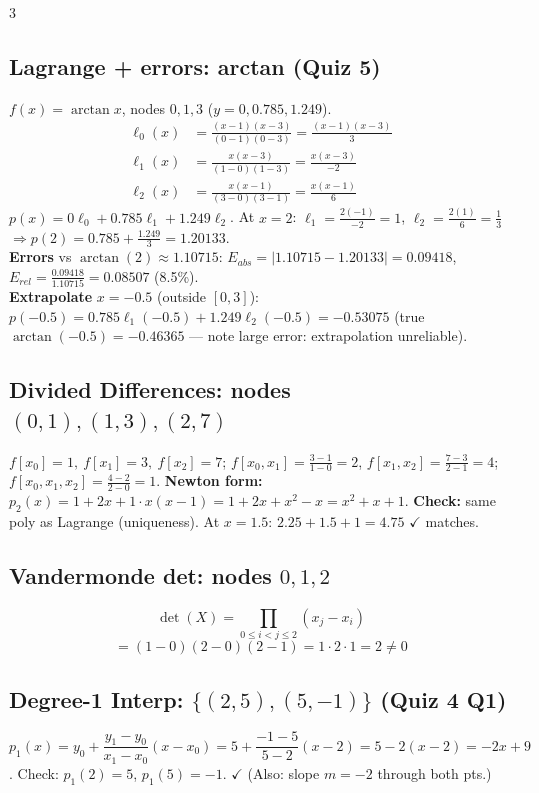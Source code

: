 \documentclass[9pt]{extarticle}
\newcommand{\hl}[1]{\textbf{\textcolor{BrickRed}{#1}}}
\begin{document}
\begin{multicols}{3}
\subsection{Lagrange + errors: arctan (Quiz 5)}
$f(x)=\arctan x$, nodes $0,1,3$ ($y=0,0.785,1.249$).
\begin{align*}
\ell_0(x)&=\tfrac{(x-1)(x-3)}{(0-1)(0-3)}=\tfrac{(x-1)(x-3)}{3}\\
\ell_1(x)&=\tfrac{x(x-3)}{(1-0)(1-3)}=\tfrac{x(x-3)}{-2}\\
\ell_2(x)&=\tfrac{x(x-1)}{(3-0)(3-1)}=\tfrac{x(x-1)}{6}
\end{align*}
$p(x)=0\ell_0+0.785\ell_1+1.249\ell_2$. At $x=2$: $\ell_1=\tfrac{2(-1)}{-2}=1$, $\ell_2=\tfrac{2(1)}{6}=\tfrac13$ $\Rightarrow p(2)=0.785+\tfrac{1.249}{3}=1.20133$. \\
\textbf{Errors} vs $\arctan(2)\approx1.10715$: $E_{abs}=|1.10715-1.20133|=0.09418$, $E_{rel}=\tfrac{0.09418}{1.10715}=0.08507$ (8.5\%). \\
\textbf{Extrapolate} $x=-0.5$ (outside $[0,3]$): $p(-0.5)=0.785\ell_1(-0.5)+1.249\ell_2(-0.5)=-0.53075$ (true $\arctan(-0.5)=-0.46365$ — note large error: extrapolation unreliable).

\subsection{Divided Differences: nodes $(0,1),(1,3),(2,7)$}
$f[x_0]=1,\ f[x_1]=3,\ f[x_2]=7$; $f[x_0,x_1]=\tfrac{3-1}{1-0}=2$, $f[x_1,x_2]=\tfrac{7-3}{2-1}=4$; $f[x_0,x_1,x_2]=\tfrac{4-2}{2-0}=1$.
\hl{Newton form:} $p_2(x)=1+2x+1\cdot x(x-1)=1+2x+x^2-x=x^2+x+1$. \textbf{Check:} same poly as Lagrange (uniqueness). At $x=1.5$: $2.25+1.5+1=4.75$ $\checkmark$ matches.

\subsection{Vandermonde det: nodes $0,1,2$}
\begin{equation*}
\det(X)=\prod_{0\le i<j\le2}(x_j-x_i)
\end{equation*}
\begin{equation*}
=(1{-}0)(2{-}0)(2{-}1)=1\cdot2\cdot1=2\ne0
\end{equation*}

\subsection{Degree-1 Interp: $\{(2,5),(5,-1)\}$ (Quiz 4 Q1)}
$p_1(x)=y_0+\dfrac{y_1-y_0}{x_1-x_0}(x-x_0)=5+\dfrac{-1-5}{5-2}(x-2)=5-2(x-2)=-2x+9$.
Check: $p_1(2)=5$, $p_1(5)=-1$. $\checkmark$ (Also: slope $m=-2$ through both pts.)


\end{multicols}
\end{document}
